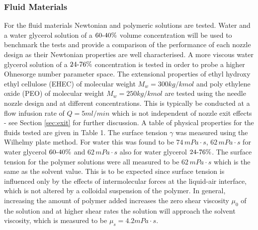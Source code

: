 \documentclass[11pt]{article}
\begin{document}
\subsubsection{Fluid Materials} \label{sec:materials}
For the fluid materials Newtonian and polymeric solutions are tested. Water and a water glycerol solution of a $60{\text -}40 \%$ volume concentration will be used to benchmark the tests and provide a comparison of the performance of each nozzle design as their Newtonian properties are well characterised. A more viscous water glycerol solution of a $24 {\text -} 76 \%$ concentration is tested in order to probe a higher Ohnesorge number parameter space. The extensional properties of ethyl hydroxy ethyl cellulose (EHEC) of molecular weight $M_w = 300 kg/kmol$ and poly ethylene oxide (PEO) of molecular weight $M_w = 250 kg/kmol$ are tested using the needle nozzle design and at different concentrations. This is typically be conducted at a flow infusion rate of $Q=5ml/min$ which is not independent of nozzle exit effects - see Section \ref{sec:exit} for further discussion. A table of physical properties for the fluids tested are given in Table 1. The surface tension $\gamma$ was measured using the Wilhelmy plate method. For water this was found to be $74 \, mPa \cdot s$, $62 \, mPa \cdot s$ for water glycerol $60 {\text -} 40\%$  and $62 \, mPa \cdot s$ also for water glycerol $24 {\text -} 76 \%$. The surface tension for the polymer solutions were all measured to be $62 \, mPa \cdot s$ which is the same as the solvent value. This is to be expected since surface tension is influenced only by the effects of intermolecular forces at the liquid-air interface, which is not altered by a colloidal suspension of the polymer. In general, increasing the amount of polymer added increases the zero shear viscosity $\mu_0$ of the solution and at higher shear rates the solution will approach the solvent viscosity, which is measured to be $\mu_{s} = 4.2 mPa \cdot s$.
\end{document}
